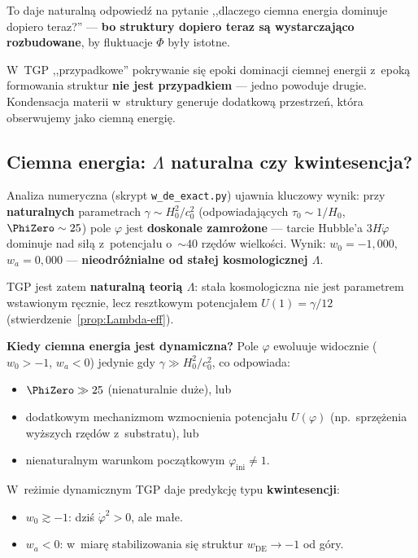 To daje naturaln\k{a} odpowied\'z na pytanie ,,dlaczego ciemna
energia dominuje dopiero teraz?'' --- \textbf{bo struktury
dopiero teraz s\k{a} wystarczaj\k{a}co rozbudowane}, by
fluktuacje $\Phi$ by\l{}y istotne.

\begin{hypothesis}\label{hyp:coincidence}
W~TGP ,,przypadkowe'' pokrywanie si\k{e} epoki dominacji
ciemnej energii z~epok\k{a} formowania struktur
\textbf{nie jest przypadkiem} --- jedno powoduje drugie.
Kondensacja materii w~struktury generuje dodatkow\k{a}
przestrze\'n, kt\'ora obserwujemy jako ciemn\k{a} energi\k{e}.
\end{hypothesis}

\subsection{Ciemna energia: $\Lambda$ naturalna czy kwintesencja?}\label{ssec:de-dyn}

Analiza numeryczna (skrypt \texttt{w\_de\_exact.py})
ujawnia kluczowy wynik: przy \textbf{naturalnych} parametrach
$\gamma \sim H_0^2/c_0^2$ (odpowiadaj\k{a}cych $\tau_0 \sim 1/H_0$,
$\PhiZero \sim 25$) pole $\varphi$ jest \textbf{doskonale zamro\.zone}
--- tarcie Hubble'a $3H\dot\varphi$ dominuje nad si\l{}\k{a}
z~potencja\l{}u o~$\sim 40$ rz\k{e}d\'ow wielko\'sci.
Wynik: $w_0 = -1{,}000$, $w_a = 0{,}000$ ---
\textbf{nieodr\'o\.znialne od sta\l{}ej kosmologicznej $\Lambda$}.

TGP jest zatem \textbf{naturaln\k{a} teori\k{a} $\Lambda$}:
sta\l{}a kosmologiczna nie jest parametrem wstawionym r\k{e}cznie,
lecz resztkowym potencja\l{}em $U(1) = \gamma/12$
(stwierdzenie~\ref{prop:Lambda-eff}).

\medskip\noindent
\textbf{Kiedy ciemna energia jest dynamiczna?}
Pole $\varphi$ ewoluuje widocznie ($w_0 > -1$, $w_a < 0$)
jedynie gdy $\gamma \gg H_0^2/c_0^2$, co odpowiada:
\begin{itemize}[nosep]
  \item $\PhiZero \gg 25$ (nienaturalnie du\.ze), lub
  \item dodatkowym mechanizmom wzmocnienia potencja\l{}u
        $U(\varphi)$ (np.\ sprz\k{e}\.zenia wy\.zszych rz\k{e}d\'ow
        z~substratu), lub
  \item nienaturalnym warunkom pocz\k{a}tkowym
        $\varphi_{\mathrm{ini}} \neq 1$.
\end{itemize}
W~re\.zimie dynamicznym TGP daje predykcj\k{e} typu
\textbf{kwintesencji}:
\begin{itemize}[nosep]
  \item $w_0 \gtrsim -1$: dzi\'s $\dot{\varphi}^2 > 0$, ale ma\l{}e.
  \item $w_a < 0$: w~miar\k{e} stabilizowania si\k{e} struktur
        $w_{\mathrm{DE}} \to -1$ od g\'ory.
\end{itemize}

